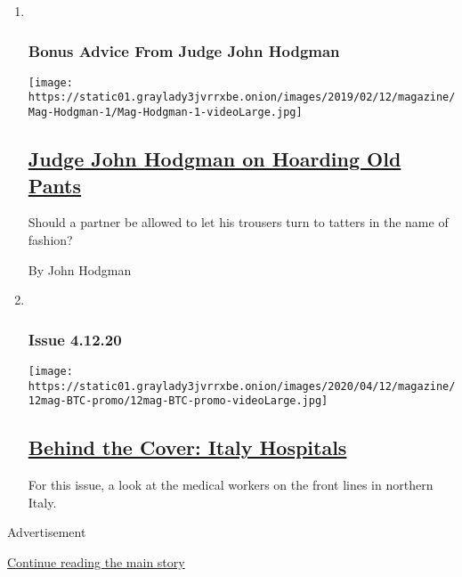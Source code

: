 \begin{enumerate}
\def\labelenumi{\arabic{enumi}.}
\item ~
  \hypertarget{bonus-advice-from-judge-john-hodgman}{%
  \subsubsection{Bonus Advice From Judge John
  Hodgman}\label{bonus-advice-from-judge-john-hodgman}}

  \texttt{[image: https://static01.graylady3jvrrxbe.onion/images/2019/02/12/magazine/Mag-Hodgman-1/Mag-Hodgman-1-videoLarge.jpg]}

  \hypertarget{judge-john-hodgman-on-hoarding-old-pants}{%
  \subsection{\texorpdfstring{\href{/2020/04/10/magazine/judge-john-hodgman-on-hoarding-old-pants.html}{Judge
  John Hodgman on Hoarding Old
  Pants}}{Judge John Hodgman on Hoarding Old Pants}}\label{judge-john-hodgman-on-hoarding-old-pants}}

  Should a partner be allowed to let his trousers turn to tatters in the
  name of fashion?

  By John Hodgman
\item ~
  \hypertarget{issue-41220}{%
  \subsubsection{Issue 4.12.20}\label{issue-41220}}

  \texttt{[image: https://static01.graylady3jvrrxbe.onion/images/2020/04/12/magazine/12mag-BTC-promo/12mag-BTC-promo-videoLarge.jpg]}

  \hypertarget{behind-the-cover-italy-hospitals}{%
  \subsection{\texorpdfstring{\href{/2020/04/09/magazine/behind-the-cover-italy-hospitals.html}{Behind
  the Cover: Italy
  Hospitals}}{Behind the Cover: Italy Hospitals}}\label{behind-the-cover-italy-hospitals}}

  For this issue, a look at the medical workers on the front lines in
  northern Italy.
\end{enumerate}

Advertisement

\protect\hyperlink{after-mid1}{Continue reading the main story}


